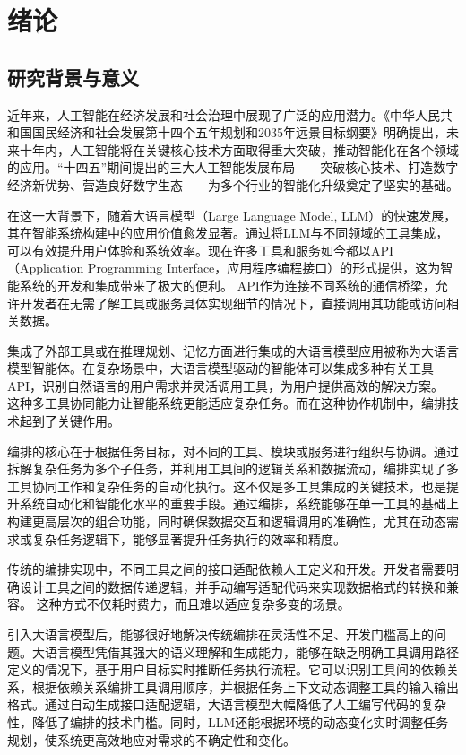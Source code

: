 
\chapter{绪论}

\section{研究背景与意义}


近年来，人工智能在经济发展和社会治理中展现了广泛的应用潜力。《中华人民共和国国民经济和社会发展第十四个五年规划和2035年远景目标纲要》明确提出，未来十年内，人工智能将在关键核心技术方面取得重大突破，推动智能化在各个领域的应用。“十四五”期间提出的三大人工智能发展布局——突破核心技术、打造数字经济新优势、营造良好数字生态——为多个行业的智能化升级奠定了坚实的基础。

在这一大背景下，随着大语言模型（Large Language Model, LLM）的快速发展，其在智能系统构建中的应用价值愈发显著。通过将LLM与不同领域的工具集成，可以有效提升用户体验和系统效率。现在许多工具和服务如今都以API（Application Programming Interface，应用程序编程接口）的形式提供，这为智能系统的开发和集成带来了极大的便利。
API作为连接不同系统的通信桥梁，允许开发者在无需了解工具或服务具体实现细节的情况下，直接调用其功能或访问相关数据。

集成了外部工具或在推理规划、记忆方面进行集成的大语言模型应用被称为大语言模型智能体。在复杂场景中，大语言模型驱动的智能体可以集成多种有关工具API，识别自然语言的用户需求并灵活调用工具，为用户提供高效的解决方案。
这种多工具协同能力让智能系统更能适应复杂任务。而在这种协作机制中，编排技术起到了关键作用。

编排的核心在于根据任务目标，对不同的工具、模块或服务进行组织与协调。通过拆解复杂任务为多个子任务，并利用工具间的逻辑关系和数据流动，编排实现了多工具协同工作和复杂任务的自动化执行。这不仅是多工具集成的关键技术，也是提升系统自动化和智能化水平的重要手段。通过编排，系统能够在单一工具的基础上构建更高层次的组合功能，同时确保数据交互和逻辑调用的准确性，尤其在动态需求或复杂任务逻辑下，能够显著提升任务执行的效率和精度。

传统的编排实现中，不同工具之间的接口适配依赖人工定义和开发。开发者需要明确设计工具之间的数据传递逻辑，并手动编写适配代码来实现数据格式的转换和兼容。
这种方式不仅耗时费力，而且难以适应复杂多变的场景。

引入大语言模型后，能够很好地解决传统编排在灵活性不足、开发门槛高上的问题。大语言模型凭借其强大的语义理解和生成能力，能够在缺乏明确工具调用路径定义的情况下，基于用户目标实时推断任务执行流程。它可以识别工具间的依赖关系，根据依赖关系编排工具调用顺序，并根据任务上下文动态调整工具的输入输出格式。通过自动生成接口适配逻辑，大语言模型大幅降低了人工编写代码的复杂性，降低了编排的技术门槛。同时，LLM还能根据环境的动态变化实时调整任务规划，使系统更高效地应对需求的不确定性和变化。

